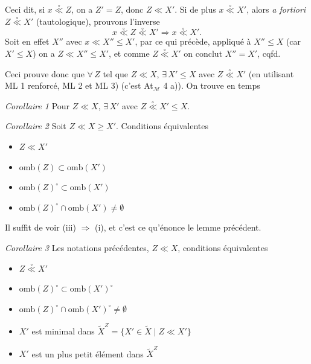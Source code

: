 \documentclass[11pt,a4paper]{article}
\begin{document}
Ceci dit, si $x \mathrel{\overset{\circ}{\ll}} Z$, on a $Z' = Z$, donc $Z \ll X'$. Si de plus $x \mathrel{\overset{\circ}{\ll}} X'$, alors \emph{a fortiori} $Z \mathrel{\overset{\circ}{\ll}} X'$ (tautologique),  prouvons l'inverse 
\[
  x \mathrel{\overset{\circ}{\ll}} Z \mathrel{\overset{\circ}{\ll}} X' \Longrightarrow x \mathrel{\overset{\circ}{\ll}} X' .
\]
Soit en effet  $X''$ avec $x \ll X'' \leq X'$, par ce qui précède, appliqué à $X'' \leq X$ (car $X' \leq X$) on a $Z \ll X'' \leq X'$, et comme $Z \mathrel{\overset{\circ}{\ll}} X'$ on conclut $X'' = X'$, cqfd.

Ceci prouve donc que $\forall\, Z$ tel que $Z \ll X$, $\exists\, X' \leq X$ avec $Z \mathrel{\overset{\circ}{\ll}} X'$ (en utilisant ML 1 renforcé, ML 2 et ML 3) (c'est At$_{\mathcal{M}}$ 4 a)). On trouve en \ill{} temps


\emph{Corollaire 1} Pour $Z \ll X$, $\exists\, X'$ avec $Z \mathrel{\overset{\circ}{\ll}} X' \leq X$.

\emph{Corollaire 2} Soit $Z \ll X \geq X'$. Conditions équivalentes
\begin{itemize}
  \item[(i)] $Z \ll X'$
  \item[(i bis)] $\mathrm{omb}(Z) \subset \mathrm{omb}(X')$
  \item[(ii)] $\mathrm{omb}(Z)^{\circ} \subset \mathrm{omb}(X')$
  \item[(iii)] $\mathrm{omb}(Z)^{\circ} \cap \mathrm{omb}(X') \neq \emptyset$
\end{itemize}

Il suffit de voir (iii) $\Longrightarrow$ (i), et c'est ce qu'énonce le lemme précédent.

\emph{Corollaire 3} \struck{\ill{}} Les notations précédentes, $Z \ll X$, conditions équivalentes
\begin{itemize}
  \item[(i)] $Z \mathrel{\overset{\circ}{\ll}} X'$
  \item[(ii)] $\mathrm{omb}(Z)^{\circ} \subset \mathrm{omb}(X')^{\circ}$
  \item[(iii)] $\mathrm{omb}(Z)^{\circ} \cap \mathrm{omb}(X')^{\circ} \neq \emptyset$
  \item[(iv)] $X'$ est minimal dans $\widetilde{X}^{Z} = \lbrace X' \in \widetilde{X} \mid Z \ll X' \rbrace$
  \item[(v)] $X'$ est un plus petit élément dans $\widetilde{X}^{Z}$
\end{itemize}
\end{document}
